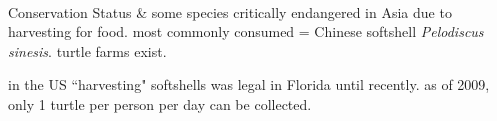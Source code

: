 \begin{center}
\begin{longtabu}
	\\
	\hline
	Conservation Status & 
	some species critically endangered in Asia due to harvesting for food. most commonly consumed = Chinese softshell \emph{Pelodiscus sinesis}. turtle farms exist.
	
	in the US ``harvesting" softshells was legal in Florida until recently. as of 2009, only 1 turtle per person per day can be collected.
	\\
	\hline
\end{longtabu}
\end{center}
